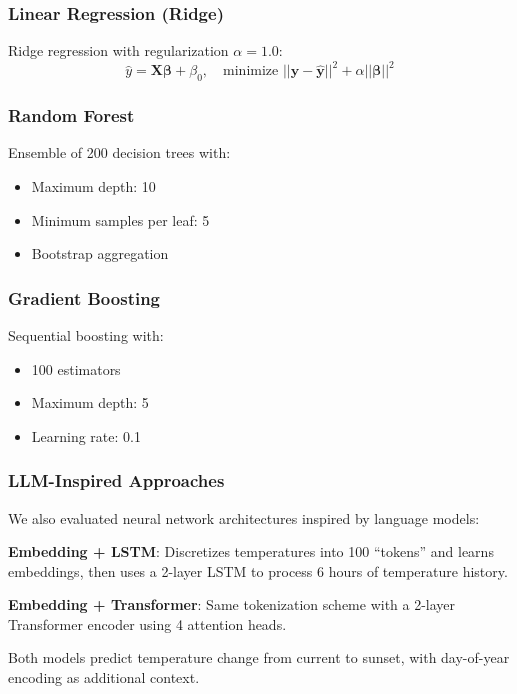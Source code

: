 \documentclass[11pt,letterpaper]{article}
\begin{document}
\subsubsection{Linear Regression (Ridge)}
Ridge regression with regularization $\alpha=1.0$:
\begin{equation}
    \hat{y} = \mathbf{X}\boldsymbol{\beta} + \beta_0, \quad \text{minimize } ||\mathbf{y} - \hat{\mathbf{y}}||^2 + \alpha||\boldsymbol{\beta}||^2
\end{equation}

\subsubsection{Random Forest}
Ensemble of 200 decision trees with:
\begin{itemize}
    \item Maximum depth: 10
    \item Minimum samples per leaf: 5
    \item Bootstrap aggregation
\end{itemize}

\subsubsection{Gradient Boosting}
Sequential boosting with:
\begin{itemize}
    \item 100 estimators
    \item Maximum depth: 5
    \item Learning rate: 0.1
\end{itemize}

\subsubsection{LLM-Inspired Approaches}

We also evaluated neural network architectures inspired by language models:

\textbf{Embedding + LSTM}: Discretizes temperatures into 100 ``tokens'' and learns embeddings, then uses a 2-layer LSTM to process 6 hours of temperature history.

\textbf{Embedding + Transformer}: Same tokenization scheme with a 2-layer Transformer encoder using 4 attention heads.

Both models predict temperature change from current to sunset, with day-of-year encoding as additional context.

\end{document}
